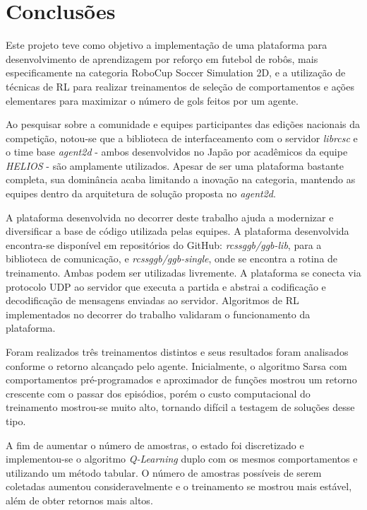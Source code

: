 
\chapter{Conclusões}
\label{chap:Conclusoes}

Este projeto teve como objetivo a implementação de uma plataforma para desenvolvimento de aprendizagem por reforço em futebol de robôs, mais especificamente na categoria RoboCup Soccer Simulation 2D, e a utilização de técnicas de RL para realizar treinamentos de seleção de comportamentos e ações elementares para maximizar o número de gols feitos por um agente.

Ao pesquisar sobre a comunidade e equipes participantes das edições nacionais da competição, notou-se que a biblioteca de interfaceamento com o servidor \textit{librcsc} e o time base \textit{agent2d} - ambos desenvolvidos no Japão por acadêmicos da equipe \textit{HELIOS} - são amplamente utilizados. Apesar de ser uma plataforma bastante completa, sua dominância acaba limitando a inovação na categoria, mantendo as equipes dentro da arquitetura de solução proposta no \textit{agent2d}.

A plataforma desenvolvida no decorrer deste trabalho ajuda a modernizar e diversificar a base de código utilizada pelas equipes. A plataforma desenvolvida encontra-se disponível em repositórios do GitHub: \textit{rcssggb/ggb-lib}, para a biblioteca de comunicação, e \textit{rcssggb/ggb-single}, onde se encontra a rotina de treinamento. Ambas podem ser utilizadas livremente. A plataforma se conecta via protocolo UDP ao servidor que executa a partida e abstrai a codificação e decodificação de mensagens enviadas ao servidor. Algoritmos de RL implementados no decorrer do trabalho validaram o funcionamento da plataforma.

Foram realizados três treinamentos distintos e seus resultados foram analisados conforme o retorno alcançado pelo agente. Inicialmente, o algoritmo Sarsa com comportamentos pré-programados e aproximador de funções mostrou um retorno crescente com o passar dos episódios, porém o custo computacional do treinamento mostrou-se muito alto, tornando difícil a testagem de soluções desse tipo.

A fim de aumentar o número de amostras, o estado foi discretizado e implementou-se o algoritmo \textit{Q-Learning} duplo com os mesmos comportamentos e utilizando um método tabular. O número de amostras possíveis de serem coletadas aumentou consideravelmente e o treinamento se mostrou mais estável, além de obter retornos mais altos.

